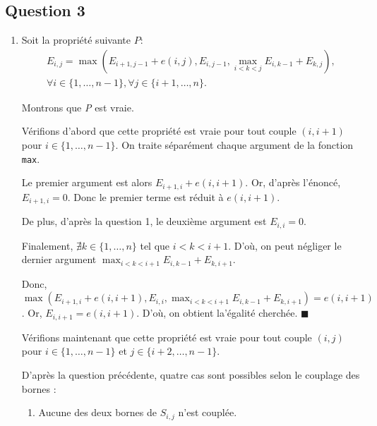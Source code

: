 \documentclass[12pt,a4paper]{article}
\begin{document}
\subsection{Question 3}
\begin{enumerate}
	\item Soit la propri\'et\'e suivante \( P :  \)
	\begin{gather*}
	E_{i,j} = \max(E_{i+1,j-1} + e(i,j), E_{i,j-1}, \displaystyle\max_{i < k < j} E_{i,k-1} + E_{k,j}), \\
	\forall i \in \{ 1, \dotsc, n - 1 \}, \forall j \in \{ i+1, \dotsc, n \}.
	\end{gather*}
	
	Montrons que {\itshape P} est vraie.
	
	
	V\'erifions d'abord que cette propri\'et\'e est vraie pour tout couple \( (i, i+1) \) pour \( i \in \{ 1, \dotsc, n - 1 \} \).
	On traite s\'epar\'ement chaque argument de la fonction \texttt{max}.
	
	Le premier argument est alors \( E_{i+1,i} + e(i,i+1) \). Or, d'apr\`es l'\'enonc\'e, \( E_{i+1,i} = 0\). Donc le premier terme est r\'eduit \`a \( e(i,i+1) \).
	
	De plus, d'apr\`es la question 1, le deuxi\`eme argument est \( E_{i,i} = 0 \).
	
	Finalement, \( \nexists k \in \{ 1, \dotsc, n \} \) tel que \( i < k < i+1 \). D'o\`u, on peut n\'egliger le dernier argument \( \displaystyle\max_{i < k < i+1} E_{i,k-1} + E_{k,i+1} \).
	
	Donc, \( \max(E_{i+1,i} + e(i,i+1), E_{i,i}, \displaystyle\max_{i < k < i+1} E_{i,k-1} + E_{k,i+1}) = e(i,i+1) \). Or, \( E_{i,i+1} = e(i,i+1) \). D'o\`u, on obtient la'\'egalit\'e cherch\'ee. \hfill\ensuremath{\blacksquare}
	
	V\'erifions maintenant que cette propri\'et\'e est vraie pour tout couple \( (i, j) \) pour \( i \in \{ 1, \dotsc, n - 1 \} \) et \( j \in \{ i+2, \dotsc, n - 1 \} \).
	
	
	D'apr\`es la question pr\'ec\'edente, quatre cas sont possibles selon le couplage des bornes :
	\begin{enumerate}
		\item Aucune des deux bornes de \( S_{i,j} \) n'est coupl\'ee.
		

\end{enumerate}
\end{enumerate}
\end{document}
